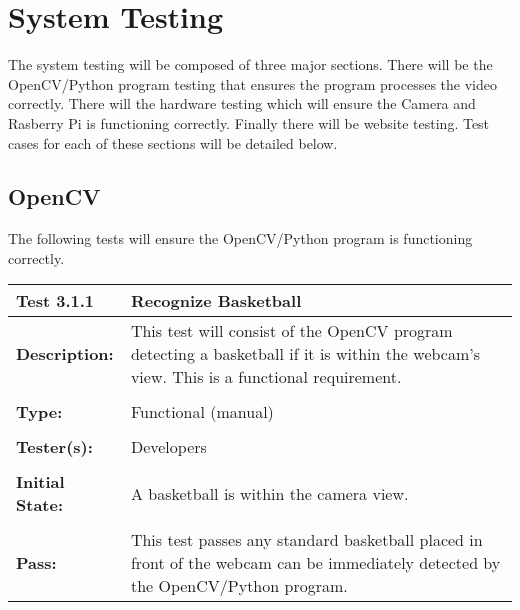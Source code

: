 \documentclass{article}
\begin{document}
\newpage
\section{System Testing}
The system testing will be composed of three major sections. There will be the OpenCV/Python program testing that ensures the program processes the video correctly. There will the hardware testing which will ensure the Camera and Rasberry Pi is functioning correctly. Finally there will be website testing. Test cases for each of these sections will be detailed below. 

\subsection {OpenCV}
The following tests will ensure the OpenCV/Python program is functioning correctly. 

\begin{tabularx}{\textwidth}{p{2cm}p{9cm}}
\toprule 
{\bf Test 3.1.1} & {\bf Recognize Basketball}\\
\midrule
\textbf{Description:} & This test will consist of the OpenCV program detecting a basketball if it is within the webcam's view. This is a functional requirement. \\[0.3\baselineskip]
                      &                     \\
\textbf{Type:} & Functional (manual)   \\[0.3\baselineskip]
                      &                     \\
\textbf{Tester(s):} & Developers \\[0.3\baselineskip]
                      &                     \\
\textbf{Initial State:} & A basketball is within the camera view. \\[0.3\baselineskip]
                      &                     \\
\textbf{Pass:} & This test passes any standard basketball placed in front of the webcam can be immediately detected by the OpenCV/Python program. \\[0.3\baselineskip]
\end{tabularx}
\end{document}
